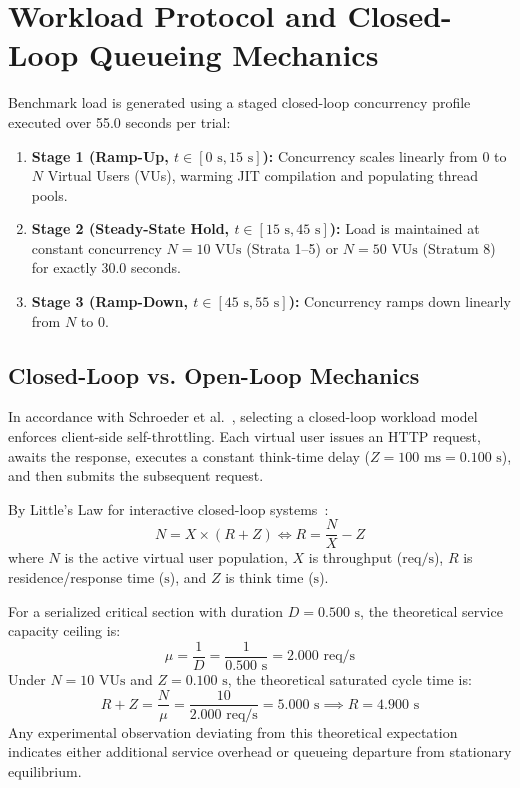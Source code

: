 \section{Workload Protocol and Closed-Loop Queueing Mechanics}
\label{sec:workload-protocol}

Benchmark load is generated using a staged closed-loop concurrency profile executed over 55.0 seconds per trial:
\begin{enumerate}
  \item \textbf{Stage 1 (Ramp-Up, $t \in [0\text{ s}, 15\text{ s}]$):} Concurrency scales linearly from 0 to $N$ Virtual Users (VUs), warming JIT compilation and populating thread pools.
  \item \textbf{Stage 2 (Steady-State Hold, $t \in [15\text{ s}, 45\text{ s}]$):} Load is maintained at constant concurrency $N = 10\text{ VUs}$ (Strata 1--5) or $N = 50\text{ VUs}$ (Stratum 8) for exactly 30.0 seconds.
  \item \textbf{Stage 3 (Ramp-Down, $t \in [45\text{ s}, 55\text{ s}]$):} Concurrency ramps down linearly from $N$ to 0.
\end{enumerate}

\subsection{Closed-Loop vs. Open-Loop Mechanics}
In accordance with Schroeder et al.~\cite{Schroeder2006}, selecting a closed-loop workload model enforces client-side self-throttling. Each virtual user issues an HTTP request, awaits the response, executes a constant think-time delay ($Z = 100\text{ ms} = 0.100\text{ s}$), and then submits the subsequent request.

By Little's Law for interactive closed-loop systems~\cite{Little1961}:
\begin{equation}
  \label{eq:interactive-law}
  N = X \times (R + Z) \iff R = \frac{N}{X} - Z
\end{equation}
where $N$ is the active virtual user population, $X$ is throughput ($\text{req/s}$), $R$ is residence/response time ($\text{s}$), and $Z$ is think time ($\text{s}$).

For a serialized critical section with duration $D = 0.500\text{ s}$, the theoretical service capacity ceiling is:
\begin{equation}
  \mu = \frac{1}{D} = \frac{1}{0.500\text{ s}} = 2.000\text{ req/s}
\end{equation}
Under $N = 10\text{ VUs}$ and $Z = 0.100\text{ s}$, the theoretical saturated cycle time is:
\begin{equation}
  R + Z = \frac{N}{\mu} = \frac{10}{2.000\text{ req/s}} = 5.000\text{ s} \implies R = 4.900\text{ s}
\end{equation}
Any experimental observation deviating from this theoretical expectation indicates either additional service overhead or queueing departure from stationary equilibrium.

